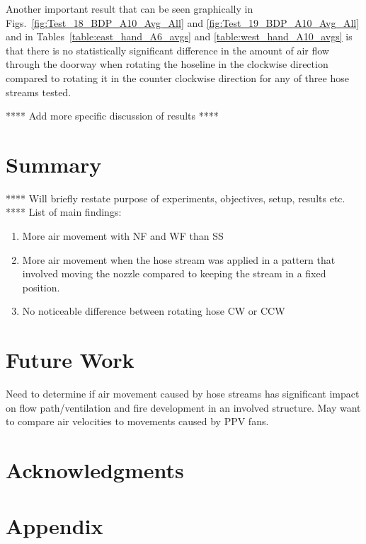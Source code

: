 \documentclass[12pt,oneside]{book}
\begin{document}

Another important result that can be seen graphically in Figs.~\ref{fig:Test_18_BDP_A10_Avg_All} and \ref{fig:Test_19_BDP_A10_Avg_All} and in Tables~\ref{table:east_hand_A6_avgs} and \ref{table:west_hand_A10_avgs} is that there is no statistically significant difference in the amount of air flow through the doorway when rotating the hoseline in the clockwise direction compared to rotating it in the counter clockwise direction for any of three hose streams tested. 

**** Add more specific discussion of results **** 


\chapter{Summary}
\label{chap:summary}
**** Will briefly restate purpose of experiments, objectives, setup, results etc. ****
List of main findings:
\begin{enumerate}
\item More air movement with NF and WF than SS
\item More air movement when the hose stream was applied in a pattern that involved moving the nozzle compared to keeping the stream in a fixed position.
\item No noticeable difference between rotating hose CW or CCW
\end{enumerate}

\chapter{Future Work}
\label{chap:Future_Work}
Need to determine if air movement caused by hose streams has significant impact on flow path/ventilation and fire development in an involved structure. May want to compare air velocities to movements caused by PPV fans.

\chapter{Acknowledgments}
\label{chap:acknowledgments}



\appendix
\chapter{Appendix}
\label{chap:appendix}
\end{document}
